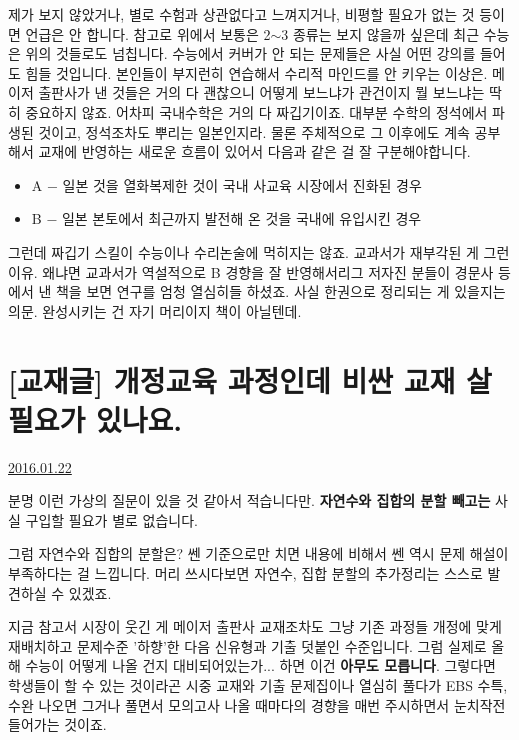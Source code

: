 제가 보지 않았거나, 별로 수험과 상관없다고 느껴지거나, 비평할 필요가 없는 것 등이면 언급은 안 합니다.
참고로 위에서 보통은 2$\sim$3 종류는 보지 않을까 싶은데 최근 수능은 위의 것들로도 넘칩니다. 
수능에서 커버가 안 되는 문제들은 사실 어떤 강의를 들어도 힘들 것입니다.
 본인들이 부지런히 연습해서 수리적 마인드를 안 키우는 이상은.
 메이저 출판사가 낸 것들은 거의 다 괜찮으니 어떻게 보느냐가 관건이지 뭘 보느냐는 딱히 중요하지 않죠.
 어차피 국내수학은 거의 다 짜깁기이죠. 대부분 수학의 정석에서 파생된 것이고, 정석조차도 뿌리는 일본인지라.
 물론 주체적으로 그 이후에도 계속 공부해서 교재에 반영하는 새로운 흐름이 있어서 다음과 같은 걸 잘 구분해야합니다.
 \begin{itemize}
     \item[] A $-$ 일본 것을 열화복제한 것이 국내 사교육 시장에서 진화된 경우
     \item[] B $-$ 일본 본토에서 최근까지 발전해 온 것을 국내에 유입시킨 경우
 \end{itemize}
 그런데 짜깁기 스킬이 수능이나 수리논술에 먹히지는 않죠.
 교과서가 재부각된 게 그런 이유.
  왜냐면 교과서가 역설적으로 B 경향을 잘 반영해서리그 저자진 분들이 경문사 등에서 낸 책을 보면 연구를 엄청 열심히들 하셨죠.
  사실 한권으로 정리되는 게 있을지는 의문. 
  완성시키는 건 자기 머리이지 책이 아닐텐데.
\vspace{5mm}







\section{[교재글] 개정교육 과정인데 비싼 교재 살 필요가 있나요.}
\href{https://www.kockoc.com/Apoc/605445}{2016.01.22}

\vspace{5mm}

분명 이런 가상의 질문이 있을 것 같아서 적습니다만.
\textbf{자연수와 집합의 분할 빼고는} 사실 구입할 필요가 별로 없습니다.
\vspace{5mm}

그럼 자연수와 집합의 분할은?
쎈 기준으로만 치면 내용에 비해서 쎈 역시 문제 해설이 부족하다는 걸 느낍니다.
머리 쓰시다보면 자연수, 집합 분할의 추가정리는 스스로 발견하실 수 있겠죠.
\vspace{5mm}

지금 참고서 시장이 웃긴 게
메이저 출판사 교재조차도 그냥 기존 과정들 개정에 맞게 재배치하고 문제수준 '하향'한 다음 신유형과 기출 덧붙인 수준입니다.
그럼 실제로 올해 수능이 어떻게 나올 건지 대비되어있는가... 하면 이건 \textbf{아무도 모릅니다}.
그렇다면 학생들이 할 수 있는 것이라곤
시중 교재와 기출 문제집이나 열심히 풀다가 EBS 수특, 수완 나오면 그거나 풀면서
모의고사 나올 때마다의 경향을 매번 주시하면서 눈치작전 들어가는 것이죠.
\vspace{5mm}

